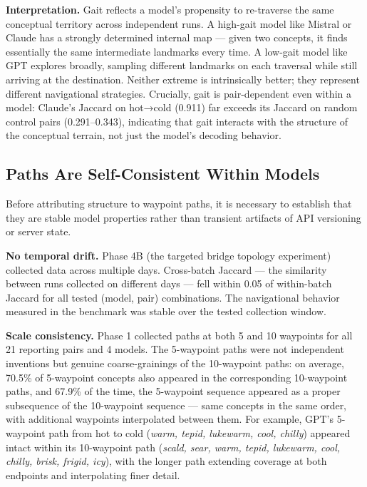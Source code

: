 \textbf{Interpretation.} Gait reflects a model's propensity to re-traverse the same conceptual territory across independent runs. A high-gait model like Mistral or Claude has a strongly determined internal map --- given two concepts, it finds essentially the same intermediate landmarks every time. A low-gait model like GPT explores broadly, sampling different landmarks on each traversal while still arriving at the destination. Neither extreme is intrinsically better; they represent different navigational strategies. Crucially, gait is pair-dependent even within a model: Claude's Jaccard on hot→cold (0.911) far exceeds its Jaccard on random control pairs (0.291--0.343), indicating that gait interacts with the structure of the conceptual terrain, not just the model's decoding behavior.

\subsection{Paths Are Self-Consistent Within Models}\label{paths-are-self-consistent-within-models}

Before attributing structure to waypoint paths, it is necessary to establish that they are stable model properties rather than transient artifacts of API versioning or server state.

\textbf{No temporal drift.} Phase 4B (the targeted bridge topology experiment) collected data across multiple days. Cross-batch Jaccard --- the similarity between runs collected on different days --- fell within 0.05 of within-batch Jaccard for all tested (model, pair) combinations. The navigational behavior measured in the benchmark was stable over the tested collection window.

\textbf{Scale consistency.} Phase 1 collected paths at both 5 and 10 waypoints for all 21 reporting pairs and 4 models. The 5-waypoint paths were not independent inventions but genuine coarse-grainings of the 10-waypoint paths: on average, 70.5\% of 5-waypoint concepts also appeared in the corresponding 10-waypoint paths, and 67.9\% of the time, the 5-waypoint sequence appeared as a proper subsequence of the 10-waypoint sequence --- same concepts in the same order, with additional waypoints interpolated between them. For example, GPT's 5-waypoint path from hot to cold (\emph{warm, tepid, lukewarm, cool, chilly}) appeared intact within its 10-waypoint path (\emph{scald, sear, warm, tepid, lukewarm, cool, chilly, brisk, frigid, icy}), with the longer path extending coverage at both endpoints and interpolating finer detail.

